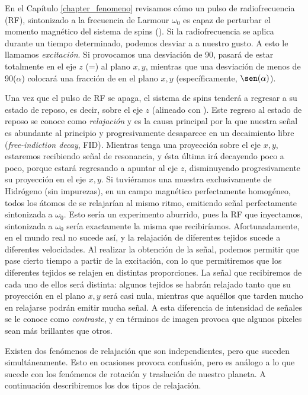 En el Capítulo \ref{chapter_fenomeno} revisamos cómo un pulso de 
radiofrecuencia (RF), sintonizado a la frecuencia de Larmour $\omega_0$ es 
capaz de perturbar el momento magnético del sistema de spins (\M). Si la 
radiofrecuencia se aplica durante un tiempo determinado, podemos desviar a \M
a nuestro gusto. A esto le llamamos 
\textit{excitación}. Si provocamos una desviación de 90\degrees, \M
pasará de estar totalmente en el eje $z$ (\Mz=\M) al plano $x,y$, mientras que una  desviación de menos de 90\degrees ($\alpha$\degrees) colocará una fracción de \M en el plano $x,y$ (específicamente, $\sen(\alpha)$).

Una vez que el pulso de RF se apaga, el sistema de spins tenderá a regresar a 
su estado de reposo, es decir, sobre el eje $z$ (alineado con \Bzero). Este 
regreso al estado de reposo se conoce como \textit{relajación} y es la causa principal por la que nuestra señal es abundante al principio y progresivamente desaparece en un decaimiento libre (\textit{free-indiction decay}, FID). Mientras  \M tenga una proyección sobre el eje $x,y$, estaremos recibiendo señal de resonancia, y ésta última irá decayendo poco a poco, porque \M estará regresando a apuntar al eje $z$, disminuyendo progresivamente su proyección en el eje $x,y$. Si tuviéramos una muestra exclusivamente de 
Hidrógeno (sin impurezas), en un campo magnético perfectamente homogéneo, todos 
los átomos de  se relajarían al mismo ritmo, emitiendo señal perfectamente 
sintonizada a $\omega_0$. Esto sería un experimento aburrido, pues la RF que 
inyectamos, sintonizada a $\omega_0$ sería exactamente la misma que 
recibiríamos. Afortunadamente, en el mundo real no sucede así, y la relajación 
de diferentes tejidos sucede a diferentes velocidades. Al realizar la obtención 
de la señal, podemos permitir que pase cierto tiempo a partir de la excitación, 
con lo que permitiremos que los diferentes tejidos se relajen en distintas 
proporciones. La señal que recibiremos de cada uno de ellos será 
distinta: algunos tejidos se habrán relajado tanto que su proyección en el 
plano $x,y$ será casi nula, mientras que aquéllos que tarden mucho en relajarse 
podrán emitir mucha señal. A esta diferencia de intensidad de señales se le 
conoce como \textit{contraste}, y en términos de imagen provoca que algunos 
pixeles sean más brillantes que otros.

Existen dos fenómenos de relajación  que son independientes, pero que 
suceden simultáneamente. Esto en ocasiones provoca confusión, pero es análogo a 
lo que sucede con los fenómenos de rotación y traslación de nuestro planeta. A 
continuación describiremos los dos tipos de relajación.

